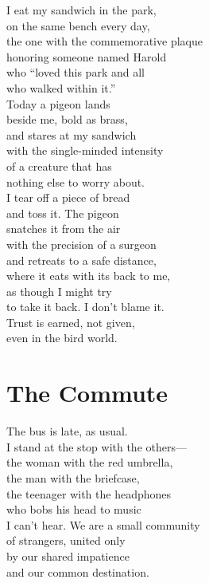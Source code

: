 \documentclass[
    language=english,
    doctype=poetry-collection,
    institution=none,
]{../../omnilatex}
\begin{document}
I eat my sandwich in the park,\\
on the same bench every day,\\
the one with the commemorative plaque\\
honoring someone named Harold\\
who ``loved this park and all\\
who walked within it.''\\

Today a pigeon lands\\
beside me, bold as brass,\\
and stares at my sandwich\\
with the single-minded intensity\\
of a creature that has\\
nothing else to worry about.\\

I tear off a piece of bread\\
and toss it. The pigeon\\
snatches it from the air\\
with the precision of a surgeon\\
and retreats to a safe distance,\\
where it eats with its back to me,\\
as though I might try\\
to take it back. I don't blame it.\\
Trust is earned, not given,\\
even in the bird world.

\section*{The Commute}

The bus is late, as usual.\\
I stand at the stop with the others---\\
the woman with the red umbrella,\\
the man with the briefcase,\\
the teenager with the headphones\\
who bobs his head to music\\
I can't hear. We are a small community\\
of strangers, united only\\
by our shared impatience\\
and our common destination.\\
\end{document}
